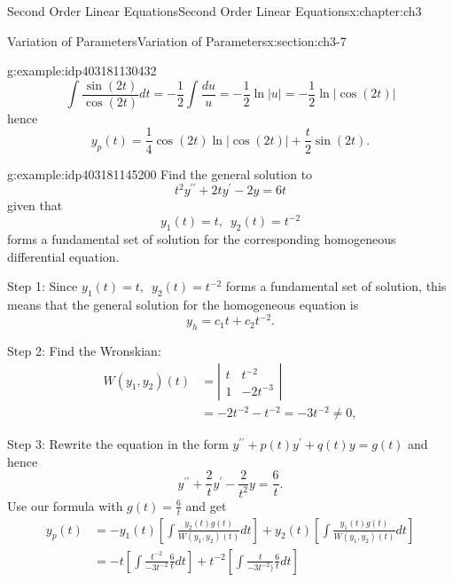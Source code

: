 \documentclass[oneside,10pt,]{book}
\numberwithin{equation}{section}
\numberwithin{equation}{section}
\newcommand{\amp}{&}
\begin{document}
\begin{chapterptx}{Second Order Linear Equations}{}{Second Order Linear Equations}{}{}{x:chapter:ch3}
\begin{sectionptx}{Variation of Parameters}{}{Variation of Parameters}{}{}{x:section:ch3-7}
\begin{example}{}{g:example:idp403181130432}
\begin{equation*}
\int\frac{\sin(2t)}{\cos\left(2t\right)}dt=-\frac{1}{2}\int\frac{du}{u}=-\frac{1}{2}\ln\left|u\right|=-\frac{1}{2}\ln\left|\cos(2t)\right|
\end{equation*}
hence%
\begin{equation*}
y_{p}(t)=\frac{1}{4}\cos(2t)\ln\left|\cos(2t)\right|+\frac{t}{2}\sin(2t).
\end{equation*}
%
\end{example}
\begin{example}{}{g:example:idp403181145200}%
Find the general solution to%
\begin{equation*}
t^{2}y^{\prime\prime}+2ty^{\prime}-2y=6t
\end{equation*}
given that%
\begin{equation*}
y_{1}(t)=t,\,\,\,y_{2}(t)=t^{-2}
\end{equation*}
forms a fundamental set of solution for the corresponding homogeneous differential equation.%
\par
Step 1: Since \(y_{1}(t)=t,\,\,\,y_{2}(t)=t^{-2}\) forms a fundamental set of solution, this means that the general solution for the homogeneous equation is%
\begin{equation*}
y_{h}=c_{1}t+c_{2}t^{-2}.
\end{equation*}
%
\par
Step 2: Find the Wronskian:%
\begin{align*}
W(y_{1},y_{2})(t) \amp =\left|\begin{array}{cc}
t \amp t^{-2}\\
1 \amp -2t^{-3}
\end{array}\right|\\
\amp =-2t^{-2}-t^{-2}=-3t^{-2}\neq0,
\end{align*}
%
\par
Step 3: Rewrite the equation in the form \(y^{\prime\prime}+p(t)y^{\prime}+q(t)y=g(t)\) and hence%
\begin{equation*}
y^{\prime\prime}+\frac{2}{t}y^{\prime}-\frac{2}{t^{2}}y=\frac{6}{t}.
\end{equation*}
Use our formula with \(g(t)=\frac{6}{t}\) and get%
\begin{align*}
y_{p}(t) \amp =-y_{1}(t)\left[\int\frac{y_{2}(t)g(t)}{W\left(y_{1},y_{2}\right)(t)}dt\right]+y_{2}(t)\left[\int\frac{y_{1}(t)g(t)}{W\left(y_{1},y_{2}\right)(t)}dt\right]\\
\amp =-t\left[\int\frac{t^{-2}}{-3t^{-2}}\frac{6}{t}dt\right]+t^{-2}\left[\int\frac{t}{-3t^{-2})}\frac{6}{t}dt\right]\\

\end{align*}
\end{example}
\end{sectionptx}
\end{chapterptx}
\end{document}
